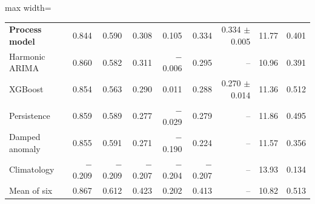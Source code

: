 \begin{table}[tbp]
\begin{adjustbox}{max width=\textwidth}
\begin{tabular}{lrrrrrrrr}
\textbf{Process model} & 0.844 & 0.590 & 0.308 & 0.105 & 0.334 & 0.334 $\pm$ 0.005 & 11.77 & 0.401 \\
Harmonic ARIMA & 0.860 & 0.582 & 0.311 & $-$0.006 & 0.295 & -- & 10.96 & 0.391 \\
XGBoost & 0.854 & 0.563 & 0.290 & 0.011 & 0.288 & 0.270 $\pm$ 0.014 & 11.36 & 0.512 \\
Persistence & 0.859 & 0.589 & 0.277 & $-$0.029 & 0.279 & -- & 11.86 & 0.495 \\
Damped anomaly & 0.855 & 0.591 & 0.271 & $-$0.190 & 0.224 & -- & 11.57 & 0.356 \\
Climatology & $-$0.209 & $-$0.209 & $-$0.207 & $-$0.204 & $-$0.207 & -- & 13.93 & 0.134 \\
\midrule
Mean of six & 0.867 & 0.612 & 0.423 & 0.202 & 0.413 & -- & 10.82 & 0.513 \\
\bottomrule
\end{tabular}
\end{adjustbox}
\end{table}
